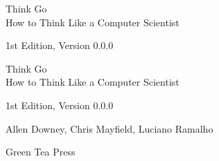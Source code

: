 \documentclass[10pt]{book}
\newcommand{\theversion}{1st Edition, Version 0.0.0}
\newcommand{\thedate}{}
\begin{document}
\begin{latexonly}

\renewcommand{\blankpage}{\thispagestyle{empty} \quad \newpage}



\thispagestyle{empty}

\begin{flushright}
\vspace*{2.0in}

\begin{spacing}{3}
{\huge Think Go}\\
{\Large How to Think Like a Computer Scientist}
\end{spacing}

\vspace{0.25in}

\theversion

\thedate

\vfill

\end{flushright}


\blankpage
\blankpage

\pagebreak
\thispagestyle{empty}

\begin{flushright}
\vspace*{2.0in}

\begin{spacing}{3}
{\huge Think Go}\\
{\Large How to Think Like a Computer Scientist}
\end{spacing}

\vspace{0.25in}

\theversion

\thedate

\vspace{1in}


{\Large
Allen Downey, Chris Mayfield, Luciano Ramalho\\
}


\vspace{0.5in}

{\Large Green Tea Press}


\end{flushright}
\end{latexonly}
\end{document}
